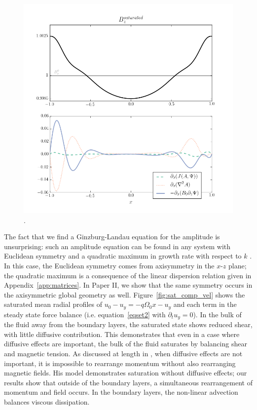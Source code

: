 \documentclass{emulateapj}
\begin{document}
\begin{figure}
\centering
\includegraphics[width=\columnwidth]{../figures/thingap_saturation_mechanism_plots_Bfield_slice60.png}
\caption{.}\label{fig:sat_comp_Bfield}
\end{figure}

The fact that we find a Ginzburg-Landau equation for the amplitude is unsurprising: such an amplitude equation can be found in any system with Euclidean symmetry and a quadratic maximum in growth rate with respect to $k$ \citep{Hoyle:2006}. In this case, the Euclidean symmetry comes from axisymmetry in the $x$-$z$ plane; the quadratic maximum is a consequence of the linear dispersion relation given in Appendix~\ref{app:matrices}.  In Paper II, we show that the same symmetry occurs in the axisymmetric global geometry as well. Figure~\ref{fig:sat_comp_vel} shows the saturated mean radial profiles of $u_0 - u_{y} = -q \Omega_0 x - u_{y}$ and each term in the steady state force balance (i.e. equation~\ref{eqset2} with $\partial_t u_{y} = 0$). In the bulk of the fluid away from the boundary layers, the saturated state shows reduced shear, with little diffusive contribution. This demonstrates that even in a case where diffusive effects are important, the bulk of the fluid saturates by balancing shear and magnetic tension. As discussed at length in \citet{Vasil:2015}, when diffusive effects are not important, it is impossible to rearrange momentum without also rearranging magnetic fields. His model demonstrates saturation without diffusive effects; our results show that outside of the boundary layers, a simultaneous rearrangement of momentum and field occurs. In the boundary layers, the non-linear advection balances viscous dissipation. 
\end{document}
